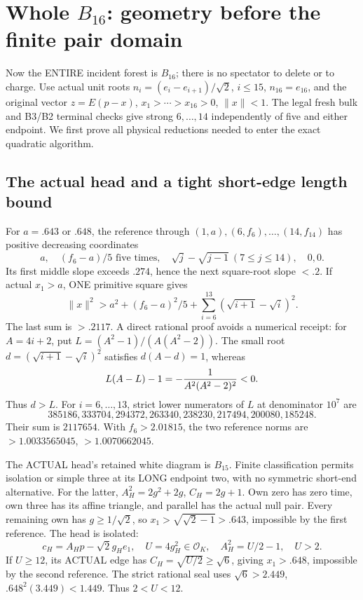\section{Whole \(B_{16}\): geometry before the finite pair domain}
\label{app:arithwholeB16}

Now the ENTIRE incident forest is \(B_{16}\);
there is no spectator to delete or to charge.
Use actual unit roots
\(n_i=(e_i-e_{i+1})/\sqrt2\), \(i\le15\),
\(n_{16}=e_{16}\), and the original vector
\(z=E(p-x)\), \(x_1>\cdots>x_{16}>0\), \(\|x\|<1\).
The legal fresh bulk and B3/B2 terminal checks
give strong \(6,\ldots,14\) independently of five
and either endpoint.
We first prove all physical reductions needed
to enter the exact quadratic algorithm.

\subsection{The actual head and a tight short-edge length bound}
\label{app:arithB16edges}

For \(a=.643\) or \(.648\), the reference through
\((1,a),(6,f_6),\ldots,(14,f_{14})\) has positive
decreasing coordinates
\[
 a,\quad(f_6-a)/5\text{ five times},\quad
 \sqrt j-\sqrt{j-1}\ (7\le j\le14),\quad0,0 .
\]
Its first middle slope exceeds \(.274\), hence
the next square-root slope \(<.2\).
If actual \(x_1>a\), ONE primitive square gives
\[
 \|x\|^2>
 a^2+(f_6-a)^2/5+
             \sum_{i=6}^{13}(\sqrt{i+1}-\sqrt i)^2.
\]
The last sum is \(>.2117\).
A direct rational proof avoids a numerical receipt:
for \(A=4i+2\), put
\(L=(A^2-1)/(A(A^2-2))\).
The small root \(d=(\sqrt{i+1}-\sqrt i)^2\)
satisfies \(d(A-d)=1\), whereas
\[
                 L(A-L)-1=-{1\over A^2(A^2-2)^2}<0 .
\]
Thus \(d>L\).
For \(i=6,\ldots,13\), strict lower numerators
of \(L\) at denominator \(10^7\) are
\[
 385186,333704,294372,263340,238230,217494,200080,185248 .
\]
Their sum is \(2117654\).
With \(f_6>2.01815\), the two reference norms are
\(>1.0033565045\), \(>1.0070662045\).

The ACTUAL head's retained white diagram is \(B_{15}\).
Finite classification permits isolation or simple
three at its LONG endpoint two, with no symmetric
short-end alternative.
For the latter,
\(A_H^2=2g^2+2g\), \(C_H=2g+1\).
Own zero has zero time, own three has its affine
triangle, and parallel has the actual null pair.
Every remaining own has \(g\ge1/\sqrt2\), so
\(x_1>\sqrt{\sqrt2-1}>.643\), impossible by the
first reference.
The head is isolated:
\[
 c_H=A_Hp-\sqrt2g_He_1,\quad
 U=4g_H^2\in\mathcal O_K,\quad A_H^2=U/2-1,\quad U>2 .
\]
If \(U\ge12\), its ACTUAL edge has
\(C_H=\sqrt{U/2}\ge\sqrt6\), giving \(x_1>.648\),
impossible by the second reference.
The strict rational seal uses
\(\sqrt6>2.449\),
\(.648^2(3.449)<1.449\).
Thus \(2<U<12\).

